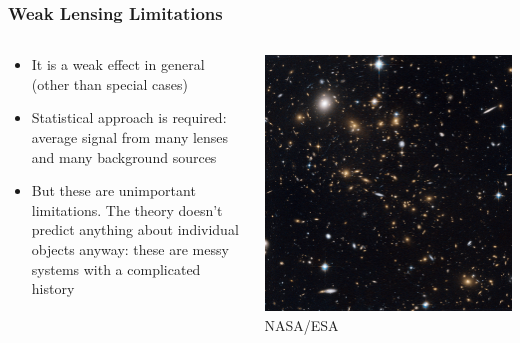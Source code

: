 \documentclass{beamer}
\begin{document}
\frame
{
    \frametitle{Weak Lensing Limitations}

    \begin{columns}
        \begin{column}{0.5\textwidth}    
            \begin{itemize}

                \item It is a weak effect in general (other than special cases)

                \item Statistical approach is required: average signal from
                    many lenses and many background sources

                \item But these are unimportant limitations. The theory doesn't
                    predict anything about individual objects anyway: these are
                    messy systems with a complicated history

            \end{itemize}
        \end{column}
        \begin{column}{0.5\textwidth}
            \begin{center}
                \includegraphics[width=\textwidth]{macs-cluster.jpg}
                \newline
                {\tiny NASA/ESA}
            \end{center}
        \end{column}
    \end{columns}
}
\end{document}
